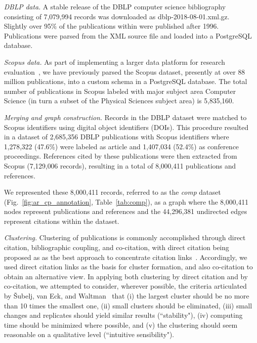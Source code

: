 \emph{DBLP data.} A stable release of the DBLP computer science bibliography~\cite{dblp_ref} consisting of 7,079,994 records was downloaded as dblp-2018-08-01.xml.gz. Slightly over 95\% of the publications within were published after 1996. Publications were parsed from the XML source file and loaded into a PostgreSQL database. 

\emph{Scopus data.} As part of implementing a larger data platform for research evaluation~\cite{GithubERNIE2019}, we have previously parsed the Scopus dataset, presently at over 88 million publications, into a custom schema in a PostgreSQL database. The total number of publications in Scopus labeled with major subject area Computer Science (in turn a subset of the Physical Sciences subject area) is 5,835,160. 

\emph{Merging and graph construction.} Records in the DBLP dataset were matched to Scopus identifiers using digital object identifiers (DOIs). This procedure resulted in a dataset of 2,685,356 DBLP publications with Scopus identifiers where 1,278,322 (47.6\%) were labeled as article and 1,407,034 (52.4\%) as conference proceedings.  References cited by these publications were then extracted from Scopus (7,129,006 records), resulting in a total of 8,000,411 publications and references. 

We represented these  8,000,411 records, referred to as the  \emph{comp} dataset (Fig.~\ref{fig:ar_cp_annotation}, Table~\ref{tab:comp}), as a graph where the 8,000,411 nodes represent publications and references  and the 44,296,381 undirected edges represent citations within the dataset.
 
\emph{Clustering.} Clustering of publications is commonly accomplished through direct citation, bibliographic coupling, and co-citation, with direct citation being proposed as as the best approach to concentrate citation links~\cite{kessler_comparison_1965,klavans_which_2017}. Accordingly, we used direct citation links as the basis for cluster formation, and also co-citation to obtain an alternative view. In applying both clustering by direct citation and by co-citation, we attempted to consider, wherever possible, the criteria articulated by \v{S}ubelj, van Eck, and Waltman~\cite{subelj_clustering_2016} that (i) the largest cluster should be no more than 10 times the smallest one, (ii) small clusters should be eliminated, (iii) small changes and replicates should yield similar results (``stability"),  (iv) computing time should be minimized where possible, and (v) the clustering should seem reasonable on a qualitative level (``intuitive sensibility").

